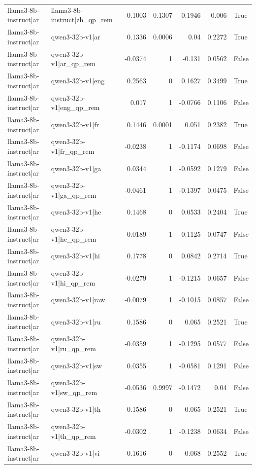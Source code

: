 \begin{table}
\begin{tabular}{l l r r r r l}
llama3-8b-instruct|ar & llama3-8b-instruct|zh_qp_rem & -0.1003 & 0.1307 & -0.1946 & -0.006 & True \\
llama3-8b-instruct|ar & qwen3-32b-v1|ar & 0.1336 & 0.0006 & 0.04 & 0.2272 & True \\
llama3-8b-instruct|ar & qwen3-32b-v1|ar_qp_rem & -0.0374 & 1 & -0.131 & 0.0562 & False \\
llama3-8b-instruct|ar & qwen3-32b-v1|eng & 0.2563 & 0 & 0.1627 & 0.3499 & True \\
llama3-8b-instruct|ar & qwen3-32b-v1|eng_qp_rem & 0.017 & 1 & -0.0766 & 0.1106 & False \\
llama3-8b-instruct|ar & qwen3-32b-v1|fr & 0.1446 & 0.0001 & 0.051 & 0.2382 & True \\
llama3-8b-instruct|ar & qwen3-32b-v1|fr_qp_rem & -0.0238 & 1 & -0.1174 & 0.0698 & False \\
llama3-8b-instruct|ar & qwen3-32b-v1|ga & 0.0344 & 1 & -0.0592 & 0.1279 & False \\
llama3-8b-instruct|ar & qwen3-32b-v1|ga_qp_rem & -0.0461 & 1 & -0.1397 & 0.0475 & False \\
llama3-8b-instruct|ar & qwen3-32b-v1|he & 0.1468 & 0 & 0.0533 & 0.2404 & True \\
llama3-8b-instruct|ar & qwen3-32b-v1|he_qp_rem & -0.0189 & 1 & -0.1125 & 0.0747 & False \\
llama3-8b-instruct|ar & qwen3-32b-v1|hi & 0.1778 & 0 & 0.0842 & 0.2714 & True \\
llama3-8b-instruct|ar & qwen3-32b-v1|hi_qp_rem & -0.0279 & 1 & -0.1215 & 0.0657 & False \\
llama3-8b-instruct|ar & qwen3-32b-v1|raw & -0.0079 & 1 & -0.1015 & 0.0857 & False \\
llama3-8b-instruct|ar & qwen3-32b-v1|ru & 0.1586 & 0 & 0.065 & 0.2521 & True \\
llama3-8b-instruct|ar & qwen3-32b-v1|ru_qp_rem & -0.0359 & 1 & -0.1295 & 0.0577 & False \\
llama3-8b-instruct|ar & qwen3-32b-v1|sw & 0.0355 & 1 & -0.0581 & 0.1291 & False \\
llama3-8b-instruct|ar & qwen3-32b-v1|sw_qp_rem & -0.0536 & 0.9997 & -0.1472 & 0.04 & False \\
llama3-8b-instruct|ar & qwen3-32b-v1|th & 0.1586 & 0 & 0.065 & 0.2521 & True \\
llama3-8b-instruct|ar & qwen3-32b-v1|th_qp_rem & -0.0302 & 1 & -0.1238 & 0.0634 & False \\
llama3-8b-instruct|ar & qwen3-32b-v1|vi & 0.1616 & 0 & 0.068 & 0.2552 & True \\

\end{tabular}
\end{table}
